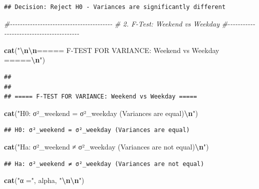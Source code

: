 \documentclass[
  12pt,
]{article}
\newenvironment{Shaded}{\begin{snugshade}}{\end{snugshade}}
\newcommand{\CommentTok}[1]{\textcolor[rgb]{0.56,0.35,0.01}{\textit{#1}}}
\newcommand{\FunctionTok}[1]{\textcolor[rgb]{0.13,0.29,0.53}{\textbf{#1}}}
\newcommand{\NormalTok}[1]{#1}
\newcommand{\SpecialCharTok}[1]{\textcolor[rgb]{0.81,0.36,0.00}{\textbf{#1}}}
\newcommand{\StringTok}[1]{\textcolor[rgb]{0.31,0.60,0.02}{#1}}
\begin{document}
\begin{verbatim}
## Decision: Reject H0 - Variances are significantly different
\end{verbatim}

\begin{Shaded}
\begin{Highlighting}[]
\CommentTok{\#{-}{-}{-}{-}{-}{-}{-}{-}{-}{-}{-}{-}{-}{-}{-}{-}{-}{-}{-}{-}{-}{-}{-}{-}{-}{-}{-}{-}{-}{-}{-}{-}{-}{-}{-}{-}{-}{-}{-}{-}{-}}
\CommentTok{\# 2. F{-}Test: Weekend vs Weekday}
\CommentTok{\#{-}{-}{-}{-}{-}{-}{-}{-}{-}{-}{-}{-}{-}{-}{-}{-}{-}{-}{-}{-}{-}{-}{-}{-}{-}{-}{-}{-}{-}{-}{-}{-}{-}{-}{-}{-}{-}{-}{-}{-}{-}}

\FunctionTok{cat}\NormalTok{(}\StringTok{"}\SpecialCharTok{\textbackslash{}n\textbackslash{}n}\StringTok{===== F{-}TEST FOR VARIANCE: Weekend vs Weekday =====}\SpecialCharTok{\textbackslash{}n}\StringTok{"}\NormalTok{)}
\end{Highlighting}
\end{Shaded}

\begin{verbatim}
## 
## 
## ===== F-TEST FOR VARIANCE: Weekend vs Weekday =====
\end{verbatim}

\begin{Shaded}
\begin{Highlighting}[]
\FunctionTok{cat}\NormalTok{(}\StringTok{"H0: σ²\_weekend = σ²\_weekday (Variances are equal)}\SpecialCharTok{\textbackslash{}n}\StringTok{"}\NormalTok{)}
\end{Highlighting}
\end{Shaded}

\begin{verbatim}
## H0: σ²_weekend = σ²_weekday (Variances are equal)
\end{verbatim}

\begin{Shaded}
\begin{Highlighting}[]
\FunctionTok{cat}\NormalTok{(}\StringTok{"Ha: σ²\_weekend ≠ σ²\_weekday (Variances are not equal)}\SpecialCharTok{\textbackslash{}n}\StringTok{"}\NormalTok{)}
\end{Highlighting}
\end{Shaded}

\begin{verbatim}
## Ha: σ²_weekend ≠ σ²_weekday (Variances are not equal)
\end{verbatim}

\begin{Shaded}
\begin{Highlighting}[]
\FunctionTok{cat}\NormalTok{(}\StringTok{"α ="}\NormalTok{, alpha, }\StringTok{"}\SpecialCharTok{\textbackslash{}n\textbackslash{}n}\StringTok{"}\NormalTok{)}
\end{Highlighting}
\end{Shaded}
\end{document}
